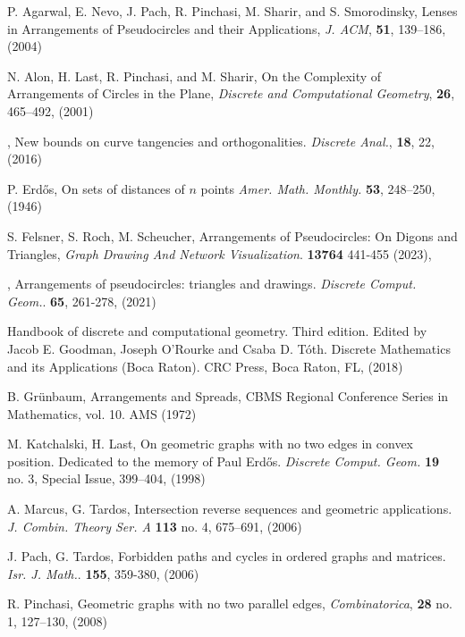 \documentclass[11pt,a4paper]{article}
\begin{document}

\begin{thebibliography}{10}
	
\footnotesize

{P. Agarwal, E. Nevo, J. Pach, R. Pinchasi, M. Sharir,
and S. Smorodinsky,}
{Lenses in Arrangements of Pseudocircles and their Applications,}
{\it J. ACM}, {\bf 51}, 139--186,  (2004) 

 {N. Alon, H. Last, R. Pinchasi, and M. Sharir}, 
{On the Complexity of Arrangements of Circles in the Plane},
{\it Discrete and Computational Geometry}, {\bf 26}, 465--492, (2001)

,  New bounds on curve tangencies and orthogonalities. {\em Discrete Anal.}, {\bf 18},  22, (2016)

{P. Erd\H os,} 
On sets of distances of $n$ points {\it Amer. Math. Monthly.} {\bf 53}, 248--250, (1946)

{S. Felsner, S. Roch, M. Scheucher},
{Arrangements of Pseudocircles: On Digons and Triangles}, {\em Graph Drawing And Network Visualization}. \textbf{13764}  441-455 (2023), 


,
 Arrangements of pseudocircles: triangles and drawings. {\em Discrete Comput. Geom.}. \textbf{65}, 261-278, (2021)

Handbook of discrete and computational geometry. Third edition. Edited by Jacob E. Goodman, Joseph O'Rourke and Csaba D. T\'oth. Discrete Mathematics and its Applications (Boca Raton). CRC Press, Boca Raton, FL, (2018)

{B. Gr\"unbaum},
{Arrangements and Spreads}, CBMS Regional Conference Series in
Mathematics, vol. 10. AMS (1972)

  {M. Katchalski, H. Last}, On geometric graphs with no two edges in convex position. Dedicated to the memory of Paul Erd\H os. {\em Discrete Comput. Geom.} {\bf 19}  no. 3, Special Issue, 399--404, (1998)
 
 {A. Marcus, G. Tardos}, Intersection reverse sequences and geometric applications. {\it J. Combin. Theory Ser. A} {\bf 113} no. 4, 675--691, (2006)

 {J. Pach, G. Tardos}, Forbidden paths and cycles in ordered graphs and matrices. {\em Isr. J. Math.}. \textbf{155}, 359-380, (2006)

 
 {R. Pinchasi},
{Geometric graphs with no two parallel edges},
{\it Combinatorica}, {\bf 28} no. 1, 127--130, (2008)


\end{thebibliography}
\end{document}
